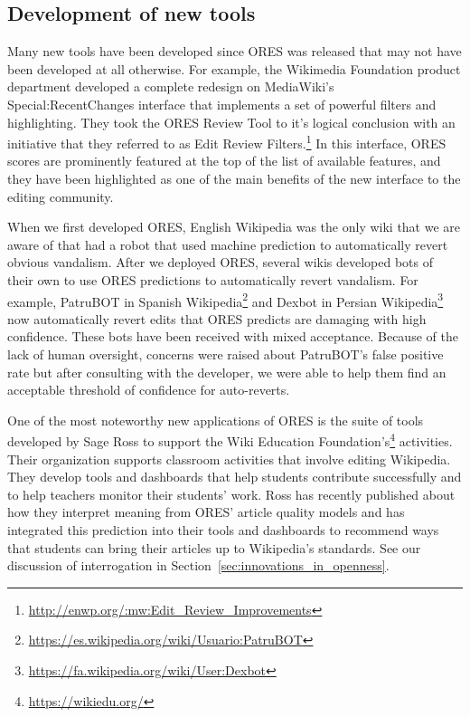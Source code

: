 \subsection{Development of new tools}

Many new tools have been developed since ORES was released that may not have been developed at all otherwise.  For example, the Wikimedia Foundation product department developed a complete redesign on MediaWiki's Special:RecentChanges interface that implements a set of powerful filters and highlighting.  They took the ORES Review Tool to it's logical conclusion with an initiative that they referred to as Edit Review Filters.\footnote{\url{http://enwp.org/:mw:Edit_Review_Improvements}}  In this interface, ORES scores are prominently featured at the top of the list of available features, and they have been highlighted as one of the main benefits of the new interface to the editing community.

When we first developed ORES, English Wikipedia was the only wiki that we are aware of that had a robot that used machine prediction to automatically revert obvious vandalism\cite{carter2008cluebot}.  After we deployed ORES, several wikis developed bots of their own to use ORES predictions to automatically revert vandalism.  For example, PatruBOT in Spanish Wikipedia\footnote{\url{https://es.wikipedia.org/wiki/Usuario:PatruBOT}} and Dexbot in Persian Wikipedia\footnote{\url{https://fa.wikipedia.org/wiki/User:Dexbot}} now automatically revert edits that ORES predicts are damaging with high confidence.  These bots have been received with mixed acceptance.  Because of the lack of human oversight, concerns were raised about PatruBOT's false positive rate but after consulting with the developer, we were able to help them find an acceptable threshold of confidence for auto-reverts.

One of the most noteworthy new applications of ORES is the suite of tools developed by Sage Ross to support the Wiki Education Foundation's\footnote{\url{https://wikiedu.org/}} activities.  Their organization supports classroom activities that involve editing Wikipedia.  They develop tools and dashboards that help students contribute successfully and to help teachers monitor their students' work.  Ross has recently published about how they interpret meaning from ORES' article quality models\cite{ross2016visualizing} and has integrated this prediction into their tools and dashboards to recommend ways that students can bring their articles up to Wikipedia's standards.  See our discussion of interrogation in Section~\ref{sec:innovations_in_openness}.
